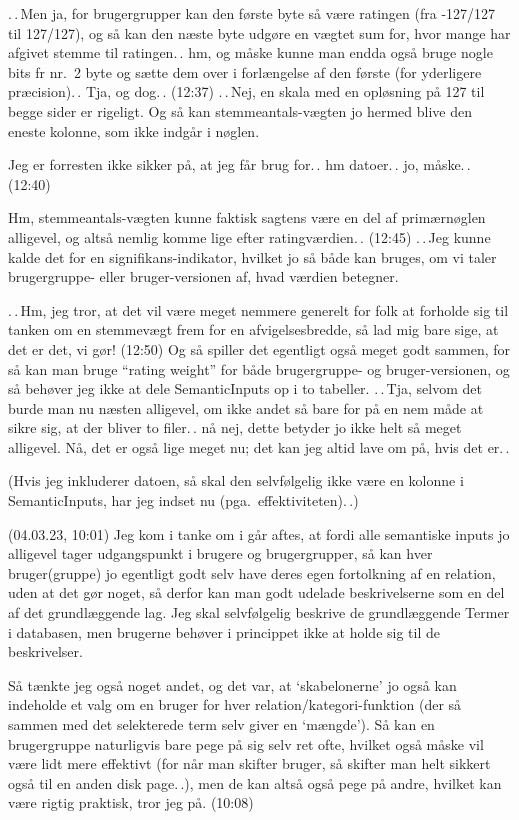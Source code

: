 \documentclass{report}
\begin{document}
.\,.\,Men ja, for brugergrupper kan den første byte så være ratingen (fra -127/127 til 127/127), og så kan den næste byte udgøre en vægtet sum for, hvor mange har afgivet stemme til ratingen.\,. hm, og måske kunne man endda også bruge nogle bits fr nr.\ 2 byte og sætte dem over i forlængelse af den første (for yderligere præcision).\,. Tja, og dog.\,. (12:37) .\,.\,Nej, en skala med en opløsning på 127 til begge sider er rigeligt. Og så kan stemmeantals-vægten jo hermed blive den eneste kolonne, som ikke indgår i nøglen. 

Jeg er forresten ikke sikker på, at jeg får brug for.\,. hm datoer.\,. jo, måske.\,. (12:40)

Hm, stemmeantals-vægten kunne faktisk sagtens være en del af primærnøglen alligevel, og altså nemlig komme lige efter ratingværdien.\,. (12:45) .\,.\,Jeg kunne kalde det for en signifikans-indikator, hvilket jo så både kan bruges, om vi taler brugergruppe- eller bruger-versionen af, hvad værdien betegner. 

.\,.\,Hm, jeg tror, at det vil være meget nemmere generelt for folk at forholde sig til tanken om en stemmevægt frem for en afvigelsesbredde, så lad mig bare sige, at det er det, vi gør! (12:50) Og så spiller det egentligt også meget godt sammen, for så kan man bruge ``rating weight'' for både brugergruppe- og bruger-versionen, og så behøver jeg ikke at dele SemanticInputs op i to tabeller. .\,.\,Tja, selvom det burde man nu næsten alligevel, om ikke andet så bare for på en nem måde at sikre sig, at der bliver to filer.\,. nå nej, dette betyder jo ikke helt så meget alligevel. Nå, det er også lige meget nu; det kan jeg altid lave om på, hvis det er.\,. 

(Hvis jeg inkluderer datoen, så skal den selvfølgelig ikke være en kolonne i SemanticInputs, har jeg indset nu (pga.\ effektiviteten).\,.)

(04.03.23, 10:01) Jeg kom i tanke om i går aftes, at fordi alle semantiske inputs jo alligevel tager udgangspunkt i brugere og brugergrupper, så kan hver bruger(gruppe) jo egentligt godt selv have deres egen fortolkning af en relation, uden at det gør noget, så derfor kan man godt udelade beskrivelserne som en del af det grundlæggende lag. Jeg skal selvfølgelig beskrive de grundlæggende Termer i databasen, men brugerne behøver i princippet ikke at holde sig til de beskrivelser.

Så tænkte jeg også noget andet, og det var, at `skabelonerne' jo også kan indeholde et valg om en bruger for hver relation/kategori-funktion (der så sammen med det selekterede term selv giver en `mængde'). Så kan en brugergruppe naturligvis bare pege på sig selv ret ofte, hvilket også måske vil være lidt mere effektivt (for når man skifter bruger, så skifter man helt sikkert også til en anden disk page.\,.), men de kan altså også pege på andre, hvilket kan være rigtig praktisk, tror jeg på. (10:08) 
\end{document}
